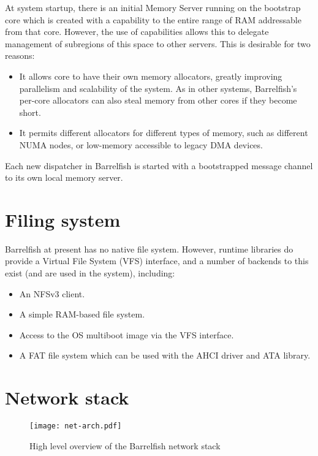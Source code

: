 \documentclass[a4paper,twoside]{report} %
\begin{document}
At system startup, there is an initial Memory Server running on the
bootstrap core which is created with a capability to the entire range
of RAM addressable from that core.  However, the use of capabilities
allows this to delegate management of subregions of this space to
other servers.  This is desirable for two reasons:
\begin{itemize}
\item It allows core to have their own memory allocators, greatly
  improving parallelism and scalability of the system. As in other
  systems, Barrelfish's per-core allocators can also steal memory from
  other cores if they become short. 
\item It permits different allocators for different types of memory,
  such as different NUMA nodes, or low-memory accessible to legacy DMA
  devices.
\end{itemize}

Each new dispatcher in Barrelfish is started with a bootstrapped
message channel to its own local memory server. 

\section{Filing system}

Barrelfish at present has no native file system.  However, runtime
libraries do provide a Virtual File System (VFS) interface, and a
number of backends to this exist (and are used in the system),
including:
\begin{itemize}
\item An NFSv3 client.
\item A simple RAM-based file system.
\item Access to the OS multiboot image via the VFS interface.
\item A FAT file system which can be used with the AHCI driver and ATA
  library. 
\end{itemize}

\section{Network stack}

\begin{figure}[hbt]
 \begin{center}
 \texttt{[image: net-arch.pdf]}
 \end{center}
 \caption{High level overview of the Barrelfish network stack}\label{fig:net-arch}
\end{figure}
\end{document}
